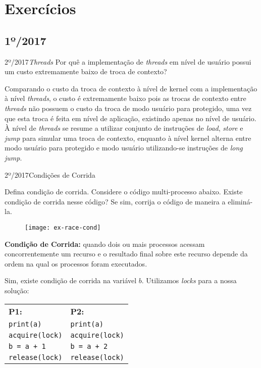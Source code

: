 \chapter{Exercícios}


\section{1º/2017}
\begin{exercicio}
  {2º/2017}{\textit{Threads}}
  {Por quê a implementação de \textit{threads} em nível de usuário possui um custo extremamente baixo de troca de contexto?}

  Comparando o custo da troca de contexto à nível de kernel com a implementação à nível \textit{threads}, o custo é extremamente baixo pois as trocas de contexto entre \textit{threads} não possuem o custo da troca de modo usuário para protegido, uma vez que esta troca é feita em nível de aplicação, existindo apenas no nível de usuário. À nível de \textit{threads} se resume a utilizar conjunto de instruções de \textit{load}, \textit{store} e \textit{jump} para simular uma troca de contexto, enquanto à nível kernel alterna entre modo usuário para protegido e modo usuário utilizando-se instruções de \textit{long jump}.
\end{exercicio}

\begin{exercicio}
  {2º/2017}{Condições de Corrida}
  {Defina condição de corrida. Considere o código multi-processo abaixo. Existe condição de corrida nesse código? Se sim, corrija o código de maneira a eliminá-la.
  \begin{figure}[H]
    \centering
    \texttt{[image: ex-race-cond]}
  \end{figure}}

  \textbf{Condição de Corrida:} quando dois ou mais processos acessam concorrentemente um recurso e o resultado final sobre este recurso depende da ordem na qual os processos foram executados.

  Sim, existe condição de corrida na variável $b$. Utilizamos \textit{locks} para a nossa solução:

  \begin{table}[H]
    \centering
    \begin{tabular}{l|l}
      \textbf{P1:}            & \textbf{P2:} \\
      \texttt{print(a)}       & \texttt{print(a)} \\
      \texttt{acquire(lock)}  & \texttt{acquire(lock)} \\
      \texttt{b = a + 1}      & \texttt{b = a + 2} \\
      \texttt{release(lock)}  & \texttt{release(lock)}\\
    \end{tabular}
  \end{table}
\end{exercicio}

